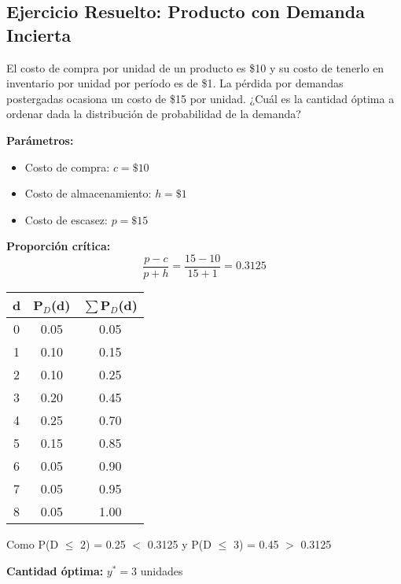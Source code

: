 \documentclass[12pt,a4paper]{book}
\begin{document}
	\subsection{Ejercicio Resuelto: Producto con Demanda Incierta}
	
	\begin{tcolorbox}[enhanced,colback=violetaclaro,colframe=moradoacento,boxrule=2pt,arc=8pt,
		drop shadow,title={\bfseries\color{white} \faPuzzlePiece\ PROBLEMA}]
		
		El costo de compra por unidad de un producto es \$10 y su costo de tenerlo en inventario por unidad por período es de \$1. La pérdida por demandas postergadas ocasiona un costo de \$15 por unidad. ¿Cuál es la cantidad óptima a ordenar dada la distribución de probabilidad de la demanda?
		
	\end{tcolorbox}
	
	\begin{tcolorbox}[enhanced,colback=azulclaro,colframe=azulprincipal,boxrule=2pt,arc=8pt,
		title={\bfseries\color{white} \faCalculator\ SOLUCIÓN}]
		
		\textbf{Parámetros:}
		\begin{itemize}[leftmargin=*,label=\textcolor{verdeprincipal}{\faArrowRight}]
			\item Costo de compra: $c = \$10$
			\item Costo de almacenamiento: $h = \$1$
			\item Costo de escasez: $p = \$15$
		\end{itemize}
		
		\textbf{Proporción crítica:}
		\begin{equation}
			\boxed{\frac{p - c}{p + h} = \frac{15 - 10}{15 + 1} = 0.3125}
		\end{equation}
		
		\begin{center}
			\small
			\begin{tabular}{|c|c|c|}
				\hline
				\rowcolor{azulclaro}
				\textbf{d} & \textbf{P$_D$(d)} & \textbf{$\sum$P$_D$(d)} \\
				\hline
				0 & 0.05 & 0.05 \\
				1 & 0.10 & 0.15 \\
				2 & 0.10 & 0.25 \\
				3 & 0.20 & 0.45 \\
				4 & 0.25 & 0.70 \\
				5 & 0.15 & 0.85 \\
				6 & 0.05 & 0.90 \\
				7 & 0.05 & 0.95 \\
				8 & 0.05 & 1.00 \\
				\hline
			\end{tabular}
		\end{center}
		
		Como P(D $\leq$ 2) = 0.25 $<$ 0.3125 y P(D $\leq$ 3) = 0.45 $>$ 0.3125
		
		\textbf{Cantidad óptima:} $y^* = 3$ unidades
		
	\end{tcolorbox}
	
\end{document}
